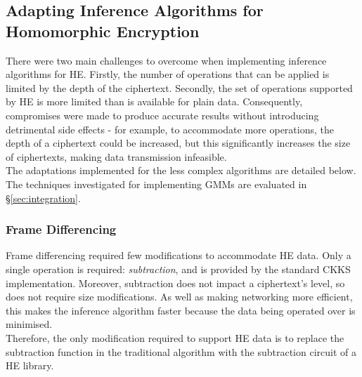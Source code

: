\subsection{Adapting Inference Algorithms for Homomorphic Encryption}
\label{sec:adaptations}
\indent \indent
There were two main challenges to overcome when implementing inference algorithms for HE. Firstly, the number of operations that can be applied is limited by the depth of the ciphertext. Secondly, the set of operations supported by HE is more limited than is available for plain data. Consequently, compromises were made to produce accurate results without introducing detrimental side effects - for example, to accommodate more operations, the depth of a ciphertext could be increased, but this significantly increases the size of ciphertexts, making data transmission infeasible.
\smallskip \\ \indent
The adaptations implemented for the less complex algorithms are detailed below. The techniques investigated for implementing GMMs are evaluated in §\ref{sec:integration}.
\subsubsection{Frame Differencing}
\indent \indent
Frame differencing required few modifications to accommodate HE data. Only a single operation is required: \textit{subtraction}, and is provided by the standard CKKS implementation. Moreover, subtraction does not impact a ciphertext's level, so does not require size modifications. As well as making networking more efficient, this makes the inference algorithm faster because the data being operated over is minimised.
\smallskip \\ \indent
Therefore, the only modification required to support HE data is to replace the subtraction function in the traditional algorithm with the subtraction circuit of a HE library.
